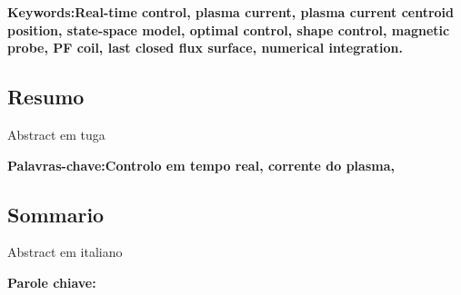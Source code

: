 \textbf{Keywords:Real-time control, plasma current, plasma current centroid position, state-space model, optimal control, shape control, magnetic probe, PF coil, last closed flux surface, numerical integration.} 

\pagebreak
\begin{otherlanguage}{portuguese}
\chapter*{Resumo}
Abstract em tuga

\vfill

\textbf{ Palavras-chave:Controlo em tempo real, corrente do plasma,  } 
\end{otherlanguage}
\pagebreak
\begin{otherlanguage}{italian}
\chapter*{Sommario}

Abstract em italiano


\vfill

\textbf{Parole chiave:} 
\end{otherlanguage}



